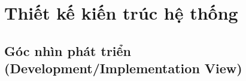 \section{Thiết kế kiến trúc hệ thống}




\subsection{Góc nhìn phát triển (Development/Implementation View)}




